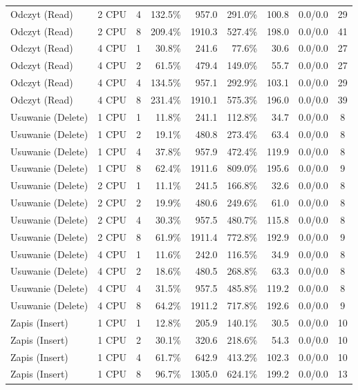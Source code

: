 \begin{table}[ht]
{\begin{tabular}{llcrrrrcc}
Odczyt (Read) & 2 CPU & 4 & 132.5\% & 957.0 & 291.0\% & 100.8 & 0.0/0.0 & 29 \\
Odczyt (Read) & 2 CPU & 8 & 209.4\% & 1910.3 & 527.4\% & 198.0 & 0.0/0.0 & 41 \\
Odczyt (Read) & 4 CPU & 1 & 30.8\% & 241.6 & 77.6\% & 30.6 & 0.0/0.0 & 27 \\
Odczyt (Read) & 4 CPU & 2 & 61.5\% & 479.4 & 149.0\% & 55.7 & 0.0/0.0 & 27 \\
Odczyt (Read) & 4 CPU & 4 & 134.5\% & 957.1 & 292.9\% & 103.1 & 0.0/0.0 & 29 \\
Odczyt (Read) & 4 CPU & 8 & 231.4\% & 1910.1 & 575.3\% & 196.0 & 0.0/0.0 & 39 \\
Usuwanie (Delete) & 1 CPU & 1 & 11.8\% & 241.1 & 112.8\% & 34.7 & 0.0/0.0 & 8 \\
Usuwanie (Delete) & 1 CPU & 2 & 19.1\% & 480.8 & 273.4\% & 63.4 & 0.0/0.0 & 8 \\
Usuwanie (Delete) & 1 CPU & 4 & 37.8\% & 957.9 & 472.4\% & 119.9 & 0.0/0.0 & 8 \\
Usuwanie (Delete) & 1 CPU & 8 & 62.4\% & 1911.6 & 809.0\% & 195.6 & 0.0/0.0 & 9 \\
Usuwanie (Delete) & 2 CPU & 1 & 11.1\% & 241.5 & 166.8\% & 32.6 & 0.0/0.0 & 8 \\
Usuwanie (Delete) & 2 CPU & 2 & 19.9\% & 480.6 & 249.6\% & 61.0 & 0.0/0.0 & 8 \\
Usuwanie (Delete) & 2 CPU & 4 & 30.3\% & 957.5 & 480.7\% & 115.8 & 0.0/0.0 & 8 \\
Usuwanie (Delete) & 2 CPU & 8 & 61.9\% & 1911.4 & 772.8\% & 192.9 & 0.0/0.0 & 9 \\
Usuwanie (Delete) & 4 CPU & 1 & 11.6\% & 242.0 & 116.5\% & 34.9 & 0.0/0.0 & 8 \\
Usuwanie (Delete) & 4 CPU & 2 & 18.6\% & 480.5 & 268.8\% & 63.3 & 0.0/0.0 & 8 \\
Usuwanie (Delete) & 4 CPU & 4 & 31.5\% & 957.5 & 485.8\% & 119.2 & 0.0/0.0 & 8 \\
Usuwanie (Delete) & 4 CPU & 8 & 64.2\% & 1911.2 & 717.8\% & 192.6 & 0.0/0.0 & 9 \\
Zapis (Insert) & 1 CPU & 1 & 12.8\% & 205.9 & 140.1\% & 30.5 & 0.0/0.0 & 10 \\
Zapis (Insert) & 1 CPU & 2 & 30.1\% & 320.6 & 218.6\% & 54.3 & 0.0/0.0 & 10 \\
Zapis (Insert) & 1 CPU & 4 & 61.7\% & 642.9 & 413.2\% & 102.3 & 0.0/0.0 & 10 \\
Zapis (Insert) & 1 CPU & 8 & 96.7\% & 1305.0 & 624.1\% & 199.2 & 0.0/0.0 & 13 \\

\end{tabular}}
\end{table}
